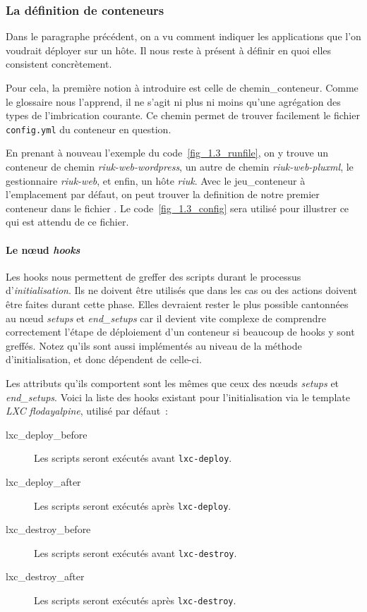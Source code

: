 \subsubsection{La définition de conteneurs}

Dans le paragraphe précédent, on a vu comment indiquer les \glspl{application} que l'on voudrait déployer sur un hôte.
Il nous reste à présent à définir en quoi elles consistent concrètement.

Pour cela, la première notion à introduire est celle de \gls{chemin_conteneur}.
Comme le glossaire nous l'apprend, il ne s'agit ni plus ni moins qu'une agrégation des types de l'\gls{imbrication} courante.
Ce chemin permet de trouver facilement le fichier {\tt config.yml} du conteneur en question.

En prenant à nouveau l'exemple du code~\ref{fig_1.3_runfile}, on y trouve un conteneur de chemin \emph{riuk-web-wordpress}, un autre de chemin \emph{riuk-web-pluxml}, le gestionnaire \emph{riuk-web}, et enfin, un hôte \emph{riuk}.
Avec le \gls{jeu_conteneur} à l'emplacement par défaut, on peut trouver la \gls{definition} de notre premier conteneur dans le fichier .
Le code~\ref{fig_1.3_config} sera utilisé pour illustrer ce qui est attendu de ce fichier.



\paragraph{Le nœud \emph{hooks}}

Les hooks nous permettent de greffer des scripts durant le processus d'\emph{initialisation}.
Ils ne doivent être utilisés que dans les cas ou des actions doivent être faites durant cette phase.
Elles devraient rester le plus possible cantonnées au nœud \emph{setups} et \emph{end\_setups} car il devient vite complexe de comprendre correctement l'étape de déploiement d'un conteneur si beaucoup de hooks y sont greffés.
Notez qu'ils sont aussi implémentés au niveau de la méthode d'\gls{initialisation}, et donc dépendent de celle-ci.

Les attributs qu'ils comportent sont les mêmes que ceux des nœuds \emph{setups} et \emph{end\_setups}.
Voici la liste des hooks existant pour l'initialisation via le template \emph{LXC} \emph{flodayalpine}, utilisé par défaut~:

\begin{description}
	\item[lxc\_deploy\_before] Les scripts seront exécutés avant {\tt lxc-deploy}.
	\item[lxc\_deploy\_after] Les scripts seront exécutés après {\tt lxc-deploy}.
	\item[lxc\_destroy\_before] Les scripts seront exécutés avant {\tt lxc-destroy}.
	\item[lxc\_destroy\_after] Les scripts seront exécutés après {\tt lxc-destroy}.
\end{description}

